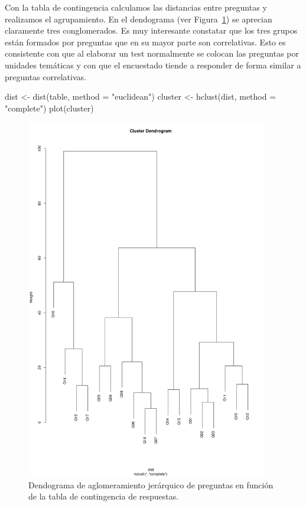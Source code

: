\documentclass[
  12pt,
  a4paper,
  extrafontsizes,
  onecolumn,
  openright]{memoir}
\newenvironment{Shaded}{\begin{snugshade}}{\end{snugshade}}
\newcommand{\AttributeTok}[1]{\textcolor[rgb]{0.40,0.45,0.13}{#1}}
\newcommand{\FunctionTok}[1]{\textcolor[rgb]{0.28,0.35,0.67}{#1}}
\newcommand{\NormalTok}[1]{\textcolor[rgb]{0.00,0.23,0.31}{#1}}
\newcommand{\OtherTok}[1]{\textcolor[rgb]{0.00,0.23,0.31}{#1}}
\newcommand{\StringTok}[1]{\textcolor[rgb]{0.13,0.47,0.30}{#1}}
\begin{document}
\normalsize

Con la tabla de contingencia calculamos las distancias entre preguntas y
realizamos el agrupamiento. En el dendograma (ver
Figura~\ref{fig-dendo}) se aprecian claramente tres conglomerados. Es
muy interesante constatar que los tres grupos están formados por
preguntas que en su mayor parte son correlativas. Esto es consistente
con que al elaborar un test normalmente se colocan las preguntas por
unidades temáticas y con que el encuestado tiende a responder de forma
similar a preguntas correlativas.

\begin{Shaded}
\begin{Highlighting}[]
\NormalTok{dist }\OtherTok{\textless{}{-}} \FunctionTok{dist}\NormalTok{(table, }\AttributeTok{method =} \StringTok{"euclidean"}\NormalTok{)}
\NormalTok{cluster }\OtherTok{\textless{}{-}} \FunctionTok{hclust}\NormalTok{(dist, }\AttributeTok{method =} \StringTok{"complete"}\NormalTok{)}
\FunctionTok{plot}\NormalTok{(cluster)}
\end{Highlighting}
\end{Shaded}

\begin{figure}[h]

{\centering \includegraphics[width=4.16667in,height=\textheight]{images/cluster.png}

}

\caption{\label{fig-dendo}Dendograma de aglomeramiento jerárquico de
preguntas en función de la tabla de contingencia de respuestas.}

\end{figure}
\end{document}
